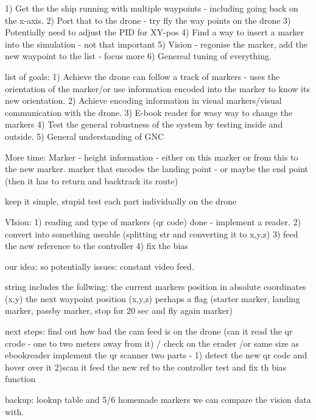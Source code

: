 

1) Get the the ship running with multiple waypoints - including going back on the x-axis. 
2) Port that to the drone - try fly the way points on the drone
3) Potentially need to adjust the PID for XY-pos 
4) Find a way to insert a marker into the simulation - not that important
5) Vision - regonise the marker, add the new waypoint to the list - focus more
6) Genereal tuning of everything. 



list of goals: 
1) Achieve the drone can follow a track of markers - uses the orientation of the marker/or use information encoded into the marker to know its new orientation.  
2) Achieve encoding information in visual markers/visual communication with  the drone.
3) E-book reader for wasy way to change the markers 
4) Test the general robustness of the system by testing inside and outside. 
5) General understanding of GNC 


More time: 
Marker - height information - either on this marker or from this to the new marker.
marker that encodes the landing point - or maybe the end point (then it has to return and backtrack its route)  

keep it simple, stupid
test each part individually on the drone


VIsion: 
1) reading and type of markers (qr code) done
 - implement a reader.
2) convert into something useable (splitting str and converting it to x,y,z)
3) feed the new reference to the controller 
4) fix the bias 

our idea: 
so potentially issues: 
constant video feed. 


string includes the follwing: 
the current markers position in absolute coordinates (x,y)
the next waypoint position (x,y,z) 
perhaps a flag (starter marker, landing marker, passby marker, stop for 20 sec and fly again marker)

next steps: 
find out how bad the cam feed is on the drone (can it read the qr crode - one to two meters away from it) / check on the erader /or same size as ebookreader  
implement the qr scanner 
two parts - 1) detect the new qr code and hover over it 2)scan it 
feed the new ref to the controller
test and fix th bias function



backup: 
lookup table and 5/6 homemade markers we can compare the vision data with. 




